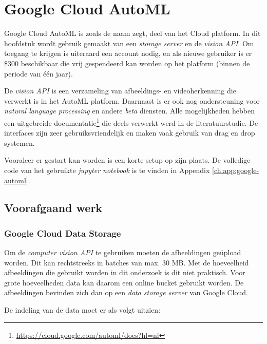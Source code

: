 
\chapter{Google Cloud AutoML}
\label{ch:google-automl}

Google Cloud AutoML is zoals de naam zegt, deel van het Cloud platform. In dit hoofdstuk wordt gebruik gemaakt van een \textit{storage server} en de \textit{vision API}. Om toegang te krijgen is uiteraard een account nodig, en als nieuwe gebruiker is er \$300 beschikbaar die vrij gespendeerd kan worden op het platform (binnen de periode van één jaar).

De \textit{vision API} is een verzameling van afbeeldings- en videoherkenning die verwerkt is in het AutoML platform. Daarnaast is er ook nog ondersteuning voor \textit{natural language processing} en andere \textit{beta} diensten. Alle mogelijkheden hebben een uitgebreide documentatie\footnote{\url{https://cloud.google.com/automl/docs?hl=nl}} die deels verwerkt werd in de literatuurstudie. De interfaces zijn zeer gebruiksvriendelijk en maken vaak gebruik van drag en drop systemen. 

Vooraleer er gestart kan worden is een korte setup op zijn plaats. De volledige code van het gebruikte \textit{jupyter notebook} is te vinden in Appendix \ref{ch:app:google-automl}.

\section{Voorafgaand werk}
\label{sec:google-automl-before}

\subsection{Google Cloud Data Storage}
\label{subsec:google-cloud-data-storage}

Om de \textit{computer vision API} te gebruiken moeten de afbeeldingen geüpload worden. Dit kan rechtstreeks in batches van max. 30 MB. Met de hoeveelheid afbeeldingen die gebruikt worden in dit onderzoek is dit niet praktisch. Voor grote hoeveelheden data kan daarom een online bucket gebruikt worden. De afbeeldingen bevinden zich dan op een \textit{data storage server} van Google Cloud.

De indeling van de data moet er als volgt uitzien:

